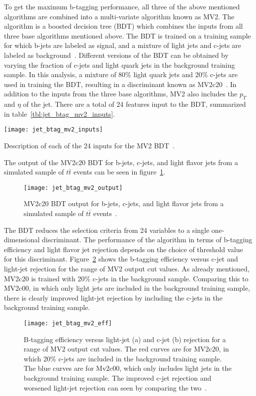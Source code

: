 To get the maximum b-tagging performance, all three of the above mentioned algorithms are combined into a multi-variate algorithm known as MV2.
The algorithm is a boosted decision tree (BDT) which combines the inputs from all three base algorithms mentioned above.
The BDT is trained on a training sample for which b-jets are labeled as signal, and a mixture of light jets and c-jets are labeled as background~\cite{jet-btag-mv2}.
Different versions of the BDT can be obtained by varying the fraction of c-jets and light quark jets in the background training sample.
In this analysis, a mixture of 80\% light quark jets and 20\% c-jets are used in training the BDT, resulting in a discriminant known as MV2c20~\cite{jet-btag-mv2}.
In addition to the inputs from the three base algorithms, MV2 also includes the $p_T$ and $\eta$ of the jet.
There are a total of 24 features input to the BDT, summarized in table~\ref{tbl:jet_btag_mv2_inputs}.
\begin{table}[!ht]
    \centering
\texttt{[image: jet\_btag\_mv2\_inputs]}
\caption{Description of each of the 24 inputs for the MV2 BDT~\cite{jet-btag-mv2}.}
\label{tbl:jet_btag_mv2_inputs}
\end{table}
The output of the MV2c20 BDT for b-jets, c-jets, and light flavor jets from a simulated sample of $t\bar{t}$ events can be seen in figure~\ref{fig:jet_btag_mv2_output}.

\begin{figure}[!ht]
    \centering
\texttt{[image: jet\_btag\_mv2\_output]}
\caption{MV2c20 BDT output for b-jets, c-jets, and light flavor jets from a simulated sample of $t\bar{t}$ events~\cite{jet-btag-mv2}.}
\label{fig:jet_btag_mv2_output}
\end{figure}

The BDT reduces the selection criteria from 24 variables to a single one-dimensional discriminant.
The performance of the algorithm in terms of b-tagging efficiency and light flavor jet rejection depends on the choice of threshold value for this discriminant.
Figure~\ref{fig:jet_btag_mv2_eff} shows the b-tagging efficiency versus c-jet and light-jet rejection for the range of MV2 output cut values.
As already  mentioned, MV2c20 is trained with 20\% c-jets in the background sample.
Comparing this to MV2c00, in which only light jets are included in the background training sample, there is clearly improved light-jet rejection by including the c-jets in the background training sample.

\begin{figure}[!ht]
    \centering
\texttt{[image: jet\_btag\_mv2\_eff]}
\caption{B-tagging efficiency versus light-jet (a) and c-jet (b) rejection for a range of MV2 output cut values.
The red curves are for MV2c20, in which 20\% c-jets are included in the background training sample.
The blue curves are for Mv2c00, which only includes light jets in the background training sample.
The improved c-jet rejection and worsened light-jet rejection can seen by comparing the two~\cite{jet-btag-mv2}.}
\label{fig:jet_btag_mv2_eff}
\end{figure}

